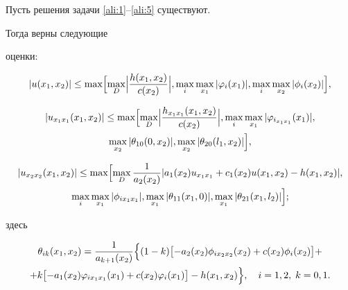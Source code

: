 \smallskip



\hypertarget{ali:lemma1}{}



\begin{lemma}[1]Пусть решения задачи \eqref{ali:1}--\eqref{ali:5} существуют{\rm .} 

Тогда верны следующие 

оценки{\rm:}

$$|u(x_1,x_2)|\le\max\Bigl[\max\limits_D\Bigl|\frac{h(x_1,x_2)}{c(x_2)}\Bigr|,\max\limits_i \max\limits_{x_1}|\varphi_i(x_1)|,\max\limits_i \max\limits_{x_2}  |\phi_i(x_2)|\Bigr],$$

\begin{multline*}

|u_{x_1 x_1}(x_1,x_2)|\le\max\Bigl[\max\limits_D \Bigl|\frac{h_{x_1 x_1}(x_1,x_2)}{c(x_2)}\Bigr|, \max\limits_i \max\limits_{x_1}|\varphi_{i_{x_1 x_1}}(x_1)|, \\ \max\limits_{x_2}|\theta_{10}(0,x_2)|,\max\limits_{x_2}|\theta_{20}(l_1,x_2)|\Bigr],

\end{multline*}

\begin{multline*}

|u_{x_2 x_2}(x_1,x_2)|\le\max\Bigl[\max\limits_D \frac{1}{a_2(x_2)}|a_1(x_2)u_{x_1 x_1}+c_1(x_2)u(x_1,x_2)-h(x_1,x_2)|,\\

\max\limits_i \max\limits_{x_1} |\phi_{ix_1 x_1}|,  \max_{x_1}|\theta_{11}(x_1,0)|,\max\limits_{x_1}|\theta_{21}(x_1,l_2)|\Bigr];

\end{multline*}







\noindent

здесь

\begin{multline*}

\theta_{i k}(x_1,x_2)=\frac{1}{a_{k+1}(x_2)}\Bigl\{(1-k)

\bigl[-a_2(x_2)\phi_{ix_2x_2}(x_2)+c(x_2)\phi_i(x_2) \bigr]+ \\ +

 k \bigl[-a_1(x_2)\varphi_{ix_1x_1}(x_1)+c(x_2)\varphi_i(x_1)\bigr]- h(x_1,x_2)\Bigr\},\quad  i = 1, 2, \; k = 0, 1.

\end{multline*}

\end{lemma}



